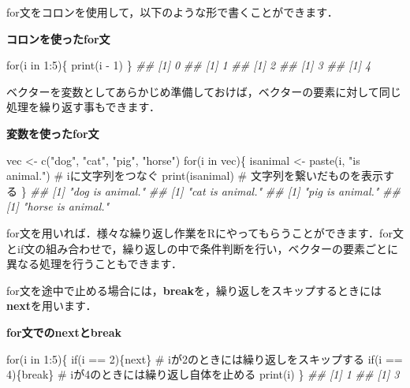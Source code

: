 \documentclass[
  letterpaper,
  DIV=11,
  numbers=noendperiod]{scrreprt}
\newenvironment{Shaded}{\begin{snugshade}}{\end{snugshade}}
\newcommand{\CommentTok}[1]{\textcolor[rgb]{0.37,0.37,0.37}{#1}}
\newcommand{\ControlFlowTok}[1]{\textcolor[rgb]{0.00,0.23,0.31}{#1}}
\newcommand{\DecValTok}[1]{\textcolor[rgb]{0.68,0.00,0.00}{#1}}
\newcommand{\DocumentationTok}[1]{\textcolor[rgb]{0.37,0.37,0.37}{\textit{#1}}}
\newcommand{\FunctionTok}[1]{\textcolor[rgb]{0.28,0.35,0.67}{#1}}
\newcommand{\NormalTok}[1]{\textcolor[rgb]{0.00,0.23,0.31}{#1}}
\newcommand{\OtherTok}[1]{\textcolor[rgb]{0.00,0.23,0.31}{#1}}
\newcommand{\SpecialCharTok}[1]{\textcolor[rgb]{0.37,0.37,0.37}{#1}}
\newcommand{\StringTok}[1]{\textcolor[rgb]{0.13,0.47,0.30}{#1}}
\begin{document}
for文をコロンを使用して，以下のような形で書くことができます．

\textbf{コロンを使ったfor文}

\begin{Shaded}
\begin{Highlighting}[]
\ControlFlowTok{for}\NormalTok{(i }\ControlFlowTok{in} \DecValTok{1}\SpecialCharTok{:}\DecValTok{5}\NormalTok{)\{}
  \FunctionTok{print}\NormalTok{(i }\SpecialCharTok{{-}} \DecValTok{1}\NormalTok{)}
\NormalTok{\}}
\DocumentationTok{\#\# [1] 0}
\DocumentationTok{\#\# [1] 1}
\DocumentationTok{\#\# [1] 2}
\DocumentationTok{\#\# [1] 3}
\DocumentationTok{\#\# [1] 4}
\end{Highlighting}
\end{Shaded}

ベクターを変数としてあらかじめ準備しておけば，ベクターの要素に対して同じ処理を繰り返す事もできます．

\textbf{変数を使ったfor文}

\begin{Shaded}
\begin{Highlighting}[]
\NormalTok{vec }\OtherTok{\textless{}{-}} \FunctionTok{c}\NormalTok{(}\StringTok{"dog"}\NormalTok{, }\StringTok{"cat"}\NormalTok{, }\StringTok{"pig"}\NormalTok{, }\StringTok{"horse"}\NormalTok{)}
\ControlFlowTok{for}\NormalTok{(i }\ControlFlowTok{in}\NormalTok{ vec)\{}
\NormalTok{  isanimal }\OtherTok{\textless{}{-}} \FunctionTok{paste}\NormalTok{(i, }\StringTok{"is animal."}\NormalTok{) }\CommentTok{\# iに文字列をつなぐ}
  \FunctionTok{print}\NormalTok{(isanimal) }\CommentTok{\# 文字列を繋いだものを表示する}
\NormalTok{\}}
\DocumentationTok{\#\# [1] "dog is animal."}
\DocumentationTok{\#\# [1] "cat is animal."}
\DocumentationTok{\#\# [1] "pig is animal."}
\DocumentationTok{\#\# [1] "horse is animal."}
\end{Highlighting}
\end{Shaded}

for文を用いれば．様々な繰り返し作業をRにやってもらうことができます．for文とif文の組み合わせで，繰り返しの中で条件判断を行い，ベクターの要素ごとに異なる処理を行うこともできます．

for文を途中で止める場合には，\textbf{break}を，繰り返しをスキップするときには\textbf{next}を用います．

\textbf{for文でのnextとbreak}

\begin{Shaded}
\begin{Highlighting}[]
\ControlFlowTok{for}\NormalTok{(i }\ControlFlowTok{in} \DecValTok{1}\SpecialCharTok{:}\DecValTok{5}\NormalTok{)\{}
  \ControlFlowTok{if}\NormalTok{(i }\SpecialCharTok{==} \DecValTok{2}\NormalTok{)\{}\ControlFlowTok{next}\NormalTok{\} }\CommentTok{\# iが2のときには繰り返しをスキップする}
  \ControlFlowTok{if}\NormalTok{(i }\SpecialCharTok{==} \DecValTok{4}\NormalTok{)\{}\ControlFlowTok{break}\NormalTok{\} }\CommentTok{\# iが4のときには繰り返し自体を止める}
  \FunctionTok{print}\NormalTok{(i)}
\NormalTok{\}}
\DocumentationTok{\#\# [1] 1}
\DocumentationTok{\#\# [1] 3}
\end{Highlighting}
\end{Shaded}
\end{document}
